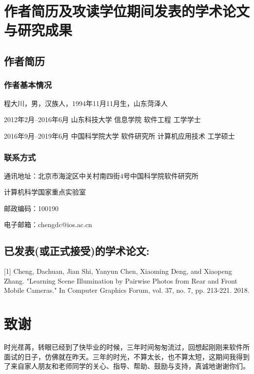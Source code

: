\chapter{作者简历及攻读学位期间发表的学术论文与研究成果}

\section*{作者简历}

\subsection*{作者基本情况}
程大川，男，汉族人，1994年11月11月生，山东菏泽人

2012年2月--2016年6月 山东科技大学 信息学院 软件工程 工学学士

2016年9月--2019年6月 中国科学院大学 软件研究所 计算机应用技术 工学硕士

\subsection*{联系方式}
通讯地址：北京市海淀区中关村南四街4号中国科学院软件研究所

计算机科学国家重点实验室

邮政编码：100190

电子邮箱：chengdc@ios.ac.cn 

\section*{已发表(或正式接受)的学术论文:}

[1] Cheng, Dachuan, Jian Shi, Yanyun Chen, Xiaoming Deng, and Xiaopeng Zhang. "Learning Scene Illumination by Pairwise Photos from Rear and Front Mobile Cameras." In Computer Graphics Forum, vol. 37, no. 7, pp. 213-221. 2018.

\chapter[致谢]{致\quad 谢}%

时光荏苒，转眼已经到了快毕业的时候，三年时间匆匆流过，回想起刚刚来软件所面试的日子，仿佛就在昨天。三年的时光，不算太长，也不算太短，这期间我得到了来自家人朋友和老师同学的关心、指导、帮助、鼓励与支持，真诚地谢谢你们。

